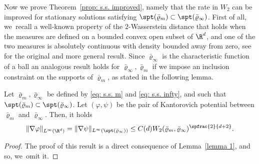 Now we prove Theorem~\ref{prop: s.s. improved}, namely that the rate in $W_2$ can be improved for stationary solutions satisfying $\spt({\bar\varrho_m})\subset\spt({\bar\varrho_\infty})$. First of all, we~recall a well-known property of the $2$-Wasserstein distance that holds when the measures are defined on a bounded convex open subset of $\R^d$, and one of the two measures is absolutely continuous with density bounded away from zero, see \cite{BJR2007} for the original and more general result. Since $\bar\varrho_\infty$ is the characteristic function of a ball an analogous result holds for $\bar\varrho_\infty, \bar\varrho_m$ if we impose an inclusion constraint on the supports of $\bar\varrho_m$, as stated in the following lemma.
\begin{lemma}\label{lemma: linfty}
Let $\bar\varrho_m, \bar\varrho_\infty$ be defined by \eqref{eq: s.s. m} and \eqref{eq: s.s. infty}, and such that $\spt({\bar\varrho_m}) \subset \spt({\bar\varrho_\infty})$. Let $(\varphi,\psi)$ be the pair of Kantorovich potential between $\bar\varrho_m$ and $\bar\varrho_\infty$. Then, it holds
\begin{equation*}
\|\nabla \varphi\|_{L^\infty(\R^d)} = \|\nabla \psi\|_{L^\infty(\spt(\bar\varrho_\infty))} \leq C(d)W_2(\bar\varrho_m, \bar\varrho_\infty)^{\spfrac{2}{d+2}}.
\end{equation*}
\end{lemma}
\begin{proof}
The proof of this result is a direct consequence of Lemma~\ref{lemma 1}, and so, we~omit it.
\end{proof}

